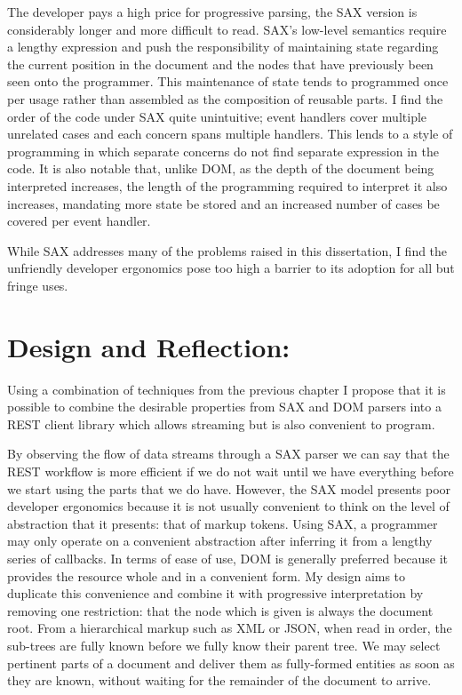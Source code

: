\documentclass[]{article}
\let\stdsection\section
\renewcommand\section{\newpage\stdsection}
\begin{document}
The developer pays a high price for progressive parsing, the SAX version
is considerably longer and more difficult to read. SAX's low-level
semantics require a lengthy expression and push the responsibility of
maintaining state regarding the current position in the document and the
nodes that have previously been seen onto the programmer. This
maintenance of state tends to programmed once per usage rather than
assembled as the composition of reusable parts. I find the order of the
code under SAX quite unintuitive; event handlers cover multiple
unrelated cases and each concern spans multiple handlers. This lends to
a style of programming in which separate concerns do not find separate
expression in the code. It is also notable that, unlike DOM, as the
depth of the document being interpreted increases, the length of the
programming required to interpret it also increases, mandating more
state be stored and an increased number of cases be covered per event
handler.

While SAX addresses many of the problems raised in this dissertation, I
find the unfriendly developer ergonomics pose too high a barrier to its
adoption for all but fringe uses.

\section{Design and Reflection:}

Using a combination of techniques from the previous chapter I propose
that it is possible to combine the desirable properties from SAX and DOM
parsers into a REST client library which allows streaming but is also
convenient to program.

By observing the flow of data streams through a SAX parser we can say
that the REST workflow is more efficient if we do not wait until we have
everything before we start using the parts that we do have. However, the
SAX model presents poor developer ergonomics because it is not usually
convenient to think on the level of abstraction that it presents: that
of markup tokens. Using SAX, a programmer may only operate on a
convenient abstraction after inferring it from a lengthy series of
callbacks. In terms of ease of use, DOM is generally preferred because
it provides the resource whole and in a convenient form. My design aims
to duplicate this convenience and combine it with progressive
interpretation by removing one restriction: that the node which is given
is always the document root. From a hierarchical markup such as XML or
JSON, when read in order, the sub-trees are fully known before we fully
know their parent tree. We may select pertinent parts of a document and
deliver them as fully-formed entities as soon as they are known, without
waiting for the remainder of the document to arrive.
\end{document}
